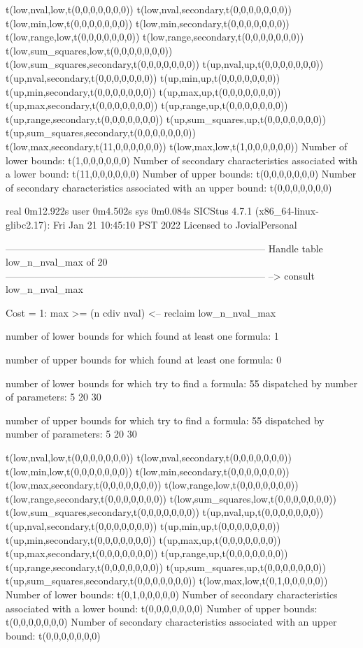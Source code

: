 t(low,nval,low,t(0,0,0,0,0,0,0))
t(low,nval,secondary,t(0,0,0,0,0,0,0))
t(low,min,low,t(0,0,0,0,0,0,0))
t(low,min,secondary,t(0,0,0,0,0,0,0))
t(low,range,low,t(0,0,0,0,0,0,0))
t(low,range,secondary,t(0,0,0,0,0,0,0))
t(low,sum_squares,low,t(0,0,0,0,0,0,0))
t(low,sum_squares,secondary,t(0,0,0,0,0,0,0))
t(up,nval,up,t(0,0,0,0,0,0,0))
t(up,nval,secondary,t(0,0,0,0,0,0,0))
t(up,min,up,t(0,0,0,0,0,0,0))
t(up,min,secondary,t(0,0,0,0,0,0,0))
t(up,max,up,t(0,0,0,0,0,0,0))
t(up,max,secondary,t(0,0,0,0,0,0,0))
t(up,range,up,t(0,0,0,0,0,0,0))
t(up,range,secondary,t(0,0,0,0,0,0,0))
t(up,sum_squares,up,t(0,0,0,0,0,0,0))
t(up,sum_squares,secondary,t(0,0,0,0,0,0,0))
t(low,max,secondary,t(11,0,0,0,0,0,0))
t(low,max,low,t(1,0,0,0,0,0,0))
Number of lower bounds:                                             t(1,0,0,0,0,0,0)
Number of secondary characteristics associated with a lower bound:  t(11,0,0,0,0,0,0)
Number of upper bounds:                                             t(0,0,0,0,0,0,0)
Number of secondary characteristics associated with an upper bound: t(0,0,0,0,0,0,0)

real	0m12.922s
user	0m4.502s
sys	0m0.084s
SICStus 4.7.1 (x86_64-linux-glibc2.17): Fri Jan 21 10:45:10 PST 2022
Licensed to JovialPersonal


--------------------------------------------------------------------------------
Handle table low_n_nval_max of 20
--------------------------------------------------------------------------------
--> consult low_n_nval_max

Cost =  1:  max >= (n cdiv nval)
<-- reclaim low_n_nval_max

number of lower bounds for which found at least one formula: 1

number of upper bounds for which found at least one formula: 0

number of lower bounds for which try to find a formula: 55
dispatched by number of parameters: 5  20  30

number of upper bounds for which try to find a formula: 55
dispatched by number of parameters: 5  20  30

t(low,nval,low,t(0,0,0,0,0,0,0))
t(low,nval,secondary,t(0,0,0,0,0,0,0))
t(low,min,low,t(0,0,0,0,0,0,0))
t(low,min,secondary,t(0,0,0,0,0,0,0))
t(low,max,secondary,t(0,0,0,0,0,0,0))
t(low,range,low,t(0,0,0,0,0,0,0))
t(low,range,secondary,t(0,0,0,0,0,0,0))
t(low,sum_squares,low,t(0,0,0,0,0,0,0))
t(low,sum_squares,secondary,t(0,0,0,0,0,0,0))
t(up,nval,up,t(0,0,0,0,0,0,0))
t(up,nval,secondary,t(0,0,0,0,0,0,0))
t(up,min,up,t(0,0,0,0,0,0,0))
t(up,min,secondary,t(0,0,0,0,0,0,0))
t(up,max,up,t(0,0,0,0,0,0,0))
t(up,max,secondary,t(0,0,0,0,0,0,0))
t(up,range,up,t(0,0,0,0,0,0,0))
t(up,range,secondary,t(0,0,0,0,0,0,0))
t(up,sum_squares,up,t(0,0,0,0,0,0,0))
t(up,sum_squares,secondary,t(0,0,0,0,0,0,0))
t(low,max,low,t(0,1,0,0,0,0,0))
Number of lower bounds:                                             t(0,1,0,0,0,0,0)
Number of secondary characteristics associated with a lower bound:  t(0,0,0,0,0,0,0)
Number of upper bounds:                                             t(0,0,0,0,0,0,0)
Number of secondary characteristics associated with an upper bound: t(0,0,0,0,0,0,0)

